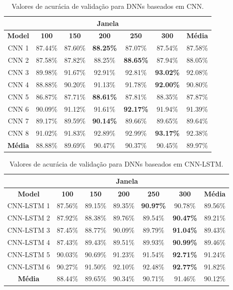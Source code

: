 \begin{table}[h!]
\caption{Valores de acurácia de validação para DNNs baseados em CNN.} 
\label{table:cnn_results}
\centering
\small
\begin{tabular}{ccccccc}
\toprule
 & \multicolumn{5}{c}{\textbf{Janela}} &  \\ \midrule
\textbf{Model} & \textbf{100} & \textbf{150} & \textbf{200} & \textbf{250} & \textbf{300} & \textbf{Média} \\ \midrule
CNN 1 & 87.44\% & 87.60\% & \textbf{88.25\%} & 87.07\% & 87.54\% & 87.58\% \\ \midrule
CNN 2 & 87.58\% & 87.82\% & 88.25\% & \textbf{88.65\%} & 87.94\% & 88.05\% \\ \midrule
CNN 3 & 89.98\% & 91.67\% & 92.91\% & 92.81\% & \textbf{93.02\%} & 92.08\% \\ \midrule
CNN 4 & 88.88\% & 90.20\% & 91.13\% & 91.78\% & \textbf{92.00\%} & 90.80\% \\ \midrule
CNN 5 & 86.87\% & 87.71\% & \textbf{88.61\%} & 87.81\% & 88.35\% & 87.87\% \\ \midrule
CNN 6 & 90.09\% & 91.12\% & 91.61\% & \textbf{92.17\%} & 91.94\% & 91.39\% \\ \midrule
CNN 7 & 89.17\% & 89.59\% & \textbf{90.14\%} & 89.66\% & 89.65\% & 89.64\% \\ \midrule
CNN 8 & 91.02\% & 91.83\% & 92.89\% & 92.99\% & \textbf{93.17\%} & 92.38\% \\ \midrule
\textbf{Média} & 88.88\% & 89.69\% & 90.47\% & 90.37\% & 90.45\% & 89.97\% \\ \bottomrule
\end{tabular}
\end{table}

\begin{table}[h!]
\caption{Valores de acurácia de validação para DNNs baseados em CNN-LSTM.} 
\label{table:cnn_lstm_results}
\centering
\small
\begin{tabular}{ccccccc}
\toprule
 & \multicolumn{5}{c}{\textbf{Janela}} &  \\ \midrule
\textbf{Model} & \textbf{100} & \textbf{150} & \textbf{200} & \textbf{250} & \textbf{300} & \textbf{Média} \\ \midrule
CNN-LSTM 1 & 87.56\% & 89.15\% & 89.35\% & \textbf{90.97\%} & 90.78\% & 89.56\% \\ \midrule
CNN-LSTM 2 & 87.92\% & 88.38\% & 89.76\% & 89.54\% & \textbf{90.47\%} & 89.21\% \\ \midrule
CNN-LSTM 3 & 87.45\% & 88.77\% & 90.09\% & 89.79\% & \textbf{91.04\%} & 89.43\% \\ \midrule
CNN-LSTM 4 & 87.43\% & 89.43\% & 89.51\% & 89.93\% & \textbf{90.99\%} & 89.46\% \\ \midrule
CNN-LSTM 5 & 90.03\% & 90.69\% & 91.23\% & 91.54\% & \textbf{92.71\%} & 91.24\% \\ \midrule
CNN-LSTM 6 & 90.27\% & 91.50\% & 92.10\% & 92.48\% & \textbf{92.77\%} & 91.82\% \\ \midrule
\textbf{Média} & 88.44\% & 89.65\% & 90.34\% & 90.71\% & 91.46\% & 90.12\% \\ \bottomrule
\end{tabular}
\end{table}

